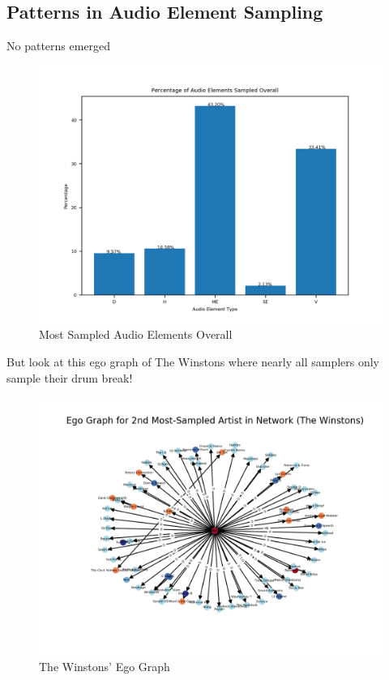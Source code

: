 \documentclass[pageno]{jpaper}
\begin{document}
\subsection{Patterns in Audio Element Sampling}
No patterns emerged
\begin{figure}[H]
\includegraphics{audioElemSampledOverall}
\caption{Most Sampled Audio Elements Overall}
\centering
\end{figure}
But look at this ego graph of The Winstons where nearly all samplers only sample their drum break!
\begin{figure}[H]
\includegraphics{./EgoGraphs/egoGraphMostSampled2TheWinstons}
\caption{The Winstons' Ego Graph}
\centering
\end{figure}
\end{document}
